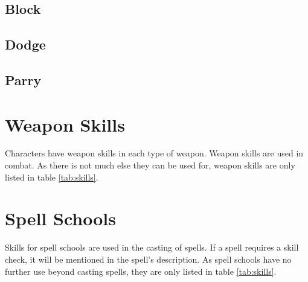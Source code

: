 \begin{multicols*}{2}
    \subsection{Block}\label{skill:block}

    \subsection{Dodge}\label{skill:dodge}

    \subsection{Parry}\label{skill:parry}

    \section{Weapon Skills}\label{weapon-skills}
    Characters have weapon skills in each type of weapon. Weapon skills are used in
    combat. As there is not much else they can be used for, weapon skills are only
    listed in table \ref{tab:skills}.


    \section{Spell Schools}\label{spell-schools}
    Skills for spell schools are used in the casting of spells. If a spell requires
    a skill check, it will be mentioned in the spell's description. As spell
    schools have no further use beyond casting spells, they are only listed in
    table \ref{tab:skills}.
\end{multicols*}

